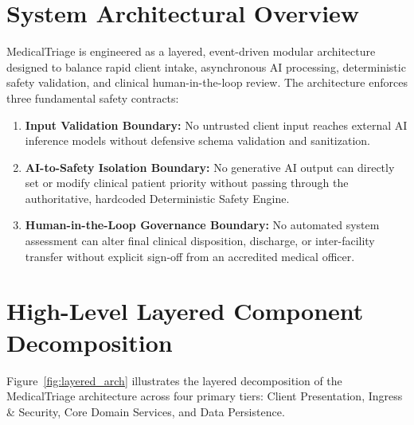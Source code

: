 \documentclass[11pt,a4paper,oneside]{report}
\begin{document}
\section{System Architectural Overview}
MedicalTriage is engineered as a layered, event-driven modular architecture designed to balance rapid client intake, asynchronous AI processing, deterministic safety validation, and clinical human-in-the-loop review. The architecture enforces three fundamental safety contracts:
\begin{enumerate}[leftmargin=20pt]
  \item \textbf{Input Validation Boundary:} No untrusted client input reaches external AI inference models without defensive schema validation and sanitization.
  \item \textbf{AI-to-Safety Isolation Boundary:} No generative AI output can directly set or modify clinical patient priority without passing through the authoritative, hardcoded Deterministic Safety Engine.
  \item \textbf{Human-in-the-Loop Governance Boundary:} No automated system assessment can alter final clinical disposition, discharge, or inter-facility transfer without explicit sign-off from an accredited medical officer.
\end{enumerate}

\section{High-Level Layered Component Decomposition}
Figure~\ref{fig:layered_arch} illustrates the layered decomposition of the MedicalTriage architecture across four primary tiers: Client Presentation, Ingress \& Security, Core Domain Services, and Data Persistence.
\end{document}
